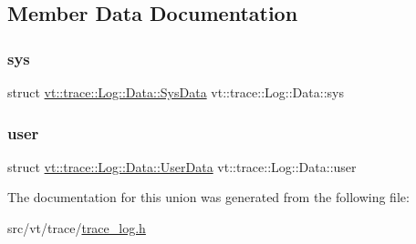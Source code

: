\subsection{Member Data Documentation}
\mbox{\label{unionvt_1_1trace_1_1_log_1_1_data_a71322b10139cee6014cd6be83c99b3d9}} 
\subsubsection{\texorpdfstring{sys}{sys}}
{\footnotesize\ttfamily struct \hyperlink{structvt_1_1trace_1_1_log_1_1_data_1_1_sys_data}{vt\+::trace\+::\+Log\+::\+Data\+::\+Sys\+Data}  vt\+::trace\+::\+Log\+::\+Data\+::sys}

\mbox{\label{unionvt_1_1trace_1_1_log_1_1_data_a8d893c0de3ee2fca0852607fa908a2e6}} 
\subsubsection{\texorpdfstring{user}{user}}
{\footnotesize\ttfamily struct \hyperlink{structvt_1_1trace_1_1_log_1_1_data_1_1_user_data}{vt\+::trace\+::\+Log\+::\+Data\+::\+User\+Data}  vt\+::trace\+::\+Log\+::\+Data\+::user}



The documentation for this union was generated from the following file\+:\begin{DoxyCompactItemize}
\item 
src/vt/trace/\hyperlink{trace__log_8h}{trace\+\_\+log.\+h}\end{DoxyCompactItemize}
